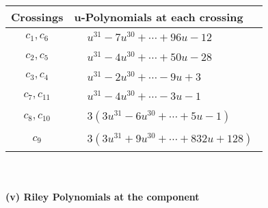 \documentclass[1p]{elsarticle_modified}
\theoremstyle{definition}
\begin{document}
\begin{tabular}{m{50pt}|m{274pt}}
Crossings & \hspace{64pt}u-Polynomials at each crossing \\
\hline $$\begin{aligned}c_{1},c_{6}\end{aligned}$$&$\begin{aligned}
&u^{31}-7 u^{30}+\cdots+96 u-12
\end{aligned}$\\
\hline $$\begin{aligned}c_{2},c_{5}\end{aligned}$$&$\begin{aligned}
&u^{31}-4 u^{30}+\cdots+50 u-28
\end{aligned}$\\
\hline $$\begin{aligned}c_{3},c_{4}\end{aligned}$$&$\begin{aligned}
&u^{31}-2 u^{30}+\cdots-9 u+3
\end{aligned}$\\
\hline $$\begin{aligned}c_{7},c_{11}\end{aligned}$$&$\begin{aligned}
&u^{31}-4 u^{30}+\cdots-3 u-1
\end{aligned}$\\
\hline $$\begin{aligned}c_{8},c_{10}\end{aligned}$$&$\begin{aligned}
&3(3 u^{31}-6 u^{30}+\cdots+5 u-1)
\end{aligned}$\\
\hline $$\begin{aligned}c_{9}\end{aligned}$$&$\begin{aligned}
&3(3 u^{31}+9 u^{30}+\cdots+832 u+128)
\end{aligned}$\\
\hline
\end{tabular}\\~\\
\newpage\renewcommand{\arraystretch}{1}
\flushleft \textbf{(v) Riley Polynomials at the component}\newline \\
\end{document}
